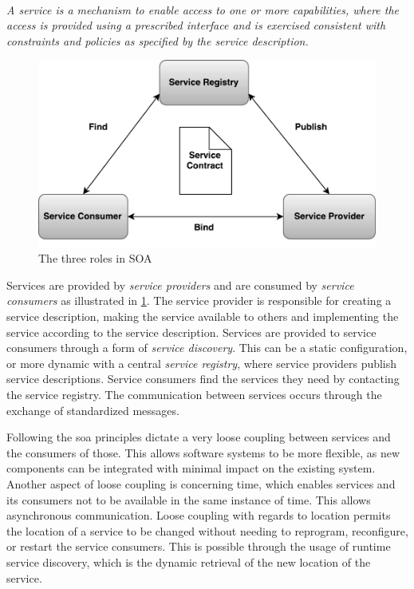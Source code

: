 \paragraph{}
\textit{
A service is a mechanism to enable access to one or more capabilities, where the
access is  provided using a prescribed interface and is exercised consistent
with constraints and policies as  specified by the service description.
}

\begin{figure}[h]
\includegraphics[scale=0.6]{images/SOA.pdf}
\caption{The three roles in SOA}
\label{figure-soa-roles}
\end{figure}

Services are provided by \textit{service providers} and are consumed by
\textit{service consumers} as illustrated in \cref{figure-soa-roles}. The
service provider is responsible for creating a service description, making the
service available to others and implementing the service according to the
service description. Services are provided to service consumers through a form
of \textit{service discovery}. This can be a static configuration, or more
dynamic with a central \textit{service registry}, where service providers
publish service descriptions. Service consumers find the services they need by
contacting the service registry. The communication between services occurs
through the exchange of standardized messages.

Following the \gls{soa} principles dictate a very loose coupling between
services and the consumers of those. This allows software systems to be more
flexible, as new components can be integrated with minimal impact on the
existing system. Another aspect of loose coupling is concerning time, which
enables services and its consumers not to be available in the same instance of
time. This allows asynchronous communication. Loose coupling with regards to
location permits the location of a service to be changed without needing to
reprogram, reconfigure, or restart the service consumers. This is possible
through the usage of runtime service discovery, which is the dynamic retrieval
of the new location of the service.

